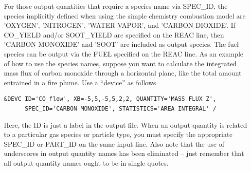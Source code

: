 \documentclass[11pt]{book}
\begin{document}
For those output quantities that require a species name via {\ct SPEC\_ID}, the species implicitly defined when using the simple chemistry
combustion model are {\ct 'OXYGEN'}, {\ct 'NITROGEN'}, {\ct 'WATER VAPOR'}, and {\ct 'CARBON DIOXIDE'}. If {\ct CO\_YIELD} and/or {\ct SOOT\_YIELD} are
specified on the {\ct REAC} line, then {\ct 'CARBON MONOXIDE'} and {\ct 'SOOT'} are included as output species. The fuel species can be output via
the {\ct FUEL} specified on the {\ct REAC} line. As an example of how to use the species names, suppose you want to calculate the integrated mass flux of carbon monoxide
through a horizontal plane, like the total amount entrained in a fire plume. Use a ``device'' as follows
\begin{lstlisting}
&DEVC ID='CO_flow', XB=-5,5,-5,5,2,2, QUANTITY='MASS FLUX Z',
      SPEC_ID='CARBON MONOXIDE', STATISTICS='AREA INTEGRAL' /
\end{lstlisting}
Here, the {\ct ID} is just a label in the output file. When an output quantity is related to a particular gas species or particle type, you must specify the appropriate {\ct SPEC\_ID} or
{\ct PART\_ID} on the same input line. Also note that the use of underscores in output quantity names has been eliminated -- just remember that all output quantity names ought to be in single quotes.



\clearpage
\end{document}
